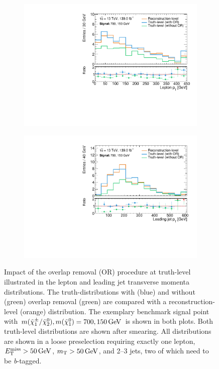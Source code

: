  \begin{figure}
	\centering
	\begin{subfigure}[b]{0.49\linewidth}
		\centering\includegraphics[width=\textwidth]{20210324_noLabel_noOR/700_150/lep1Pt_C1N2_Wh_hbb_700p0_150p0_smeared.pdf}
	\end{subfigure}\hfill
	\begin{subfigure}[b]{0.49\linewidth}
		\centering\includegraphics[width=\textwidth]{20210324_noLabel_noOR/700_150/jet1Pt_C1N2_Wh_hbb_700p0_150p0_smeared.pdf}
	\end{subfigure}\hfill
	\caption{Impact of the overlap removal (OR) procedure at truth-level illustrated in the lepton and leading jet transverse momenta distributions. The truth-distributions with (blue) and without (green) overlap removal (green) are compared with a reconstruction-level (orange) distribution. The exemplary benchmark signal point with $m(\charg/\neutr), m(\lsp) = 700, \SI{150}{\GeV}$ is shown in both plots. Both truth-level distributions are shown after smearing. All distributions are shown in a loose preselection requiring exactly one lepton, $\met>\SI{50}{\GeV}$, $\mt > \SI{50}{\GeV}$, and 2--3 jets, two of which need to be \textit{b}-tagged.}
	\label{fig:overlap_removal_truth}
\end{figure}

